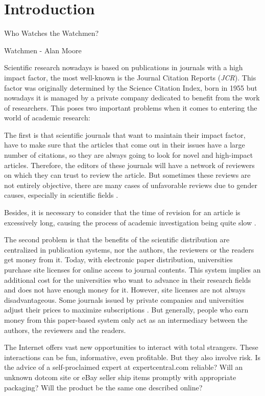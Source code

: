 \chapter{Introduction}

\begin{FraseCelebre}
  \begin{Frase}
    Who Watches the Watchmen?
  \end{Frase}
  \begin{Fuente}
    Watchmen - Alan Moore
  \end{Fuente}
\end{FraseCelebre}

Scientific research nowadays is based on publications in journals with a high
impact factor\cite{doi:10.1001/jama.295.1.90}, the most well-known is the
Journal Citation Reports (\emph{JCR}). This factor was originally determined by
the Science Citation Index, born in 1955\cite{garfield2007evolution} but
nowadays it is managed by a private company dedicated to benefit from the work
of researchers\cite{toledo2011book}. This poses two important problems when it
comes to entering the world of academic research:

The first is that scientific journals that want to maintain their impact factor,
have to make sure that the articles that come out in their issues have a large
number of citations, so they are always going to look for novel and high-impact
articles. Therefore, the editors of these journals will have a network of
reviewers on which they can trust to review the article. But sometimes these
reviews are not entirely objective, there are many cases of unfavorable reviews
due to gender causes, especially in scientific fields
\cite{wenneras2001nepotism}.

Besides, it is necessary to consider that the time of revision for an article is
excessively long, causing the process of academic investigation being quite slow
\cite{huisman2017duration}.

The second problem is that the benefits of the scientific distribution are
centralized in publication systems, nor the authors, the reviewers or the
readers get money from it. Today, with electronic paper distribution,
universities purchase site licenses for online access to journal contents. This
system implies an additional cost for the universities who want to advance in
their research fields and does not have enough money for it. However, site
licenses are not always disadvantageous. Some journals issued by private
companies and universities adjust their prices to maximize subscriptions
\cite{bergstrom2004costs}. But generally, people who earn money from this
paper-based system only act as an intermediary between the authors, the
reviewers and the readers.

The Internet offers vast new opportunities to interact with total strangers.
These interactions can be fun, informative, even profitable. But they also
involve risk. Is the advice of a self-proclaimed expert at expertcentral.com
reliable? Will an unknown dotcom site or eBay seller ship items promptly with
appropriate packaging? Will the product be the same one described online?
\cite{resnick2000reputation}


